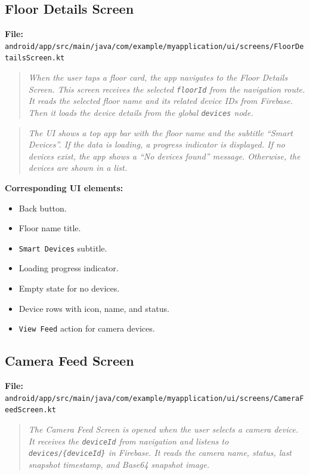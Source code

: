 \documentclass[11pt,a4paper]{article}
\begin{document}
\subsection{Floor Details Screen}
\textbf{File:} \texttt{android/app/src/main/java/com/example/myapplication/ui/screens/FloorDetailsScreen.kt}

\begin{quote}
\textit{When the user taps a floor card, the app navigates to the Floor Details Screen. This screen receives the selected \texttt{floorId} from the navigation route. It reads the selected floor name and its related device IDs from Firebase. Then it loads the device details from the global \texttt{devices} node.}
\end{quote}

\begin{quote}
\textit{The UI shows a top app bar with the floor name and the subtitle ``Smart Devices''. If the data is loading, a progress indicator is displayed. If no devices exist, the app shows a ``No devices found'' message. Otherwise, the devices are shown in a list.}
\end{quote}

\textbf{Corresponding UI elements:}
\begin{itemize}
    \item Back button.
    \item Floor name title.
    \item \texttt{Smart Devices} subtitle.
    \item Loading progress indicator.
    \item Empty state for no devices.
    \item Device rows with icon, name, and status.
    \item \texttt{View Feed} action for camera devices.
\end{itemize}

\subsection{Camera Feed Screen}
\textbf{File:} \texttt{android/app/src/main/java/com/example/myapplication/ui/screens/CameraFeedScreen.kt}

\begin{quote}
\textit{The Camera Feed Screen is opened when the user selects a camera device. It receives the \texttt{deviceId} from navigation and listens to \texttt{devices/\{deviceId\}} in Firebase. It reads the camera name, status, last snapshot timestamp, and Base64 snapshot image.}
\end{quote}
\end{document}
